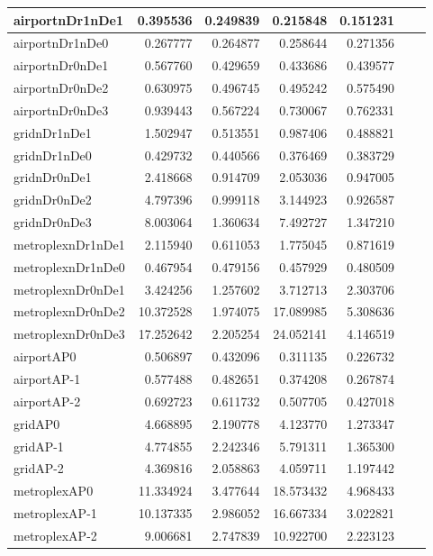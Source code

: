 \begin{longtable}{|l|r|r|r|r|r|r|}
\endlastfoot
airportnDr1nDe1 & 0.395536 & 0.249839 & 0.215848 & 0.151231 \\ \hline
airportnDr1nDe0 & 0.267777 & 0.264877 & 0.258644 & 0.271356 \\ \hline
airportnDr0nDe1 & 0.567760 & 0.429659 & 0.433686 & 0.439577 \\ \hline
airportnDr0nDe2 & 0.630975 & 0.496745 & 0.495242 & 0.575490 \\ \hline
airportnDr0nDe3 & 0.939443 & 0.567224 & 0.730067 & 0.762331 \\ \hline
gridnDr1nDe1 & 1.502947 & 0.513551 & 0.987406 & 0.488821 \\ \hline
gridnDr1nDe0 & 0.429732 & 0.440566 & 0.376469 & 0.383729 \\ \hline
gridnDr0nDe1 & 2.418668 & 0.914709 & 2.053036 & 0.947005 \\ \hline
gridnDr0nDe2 & 4.797396 & 0.999118 & 3.144923 & 0.926587 \\ \hline
gridnDr0nDe3 & 8.003064 & 1.360634 & 7.492727 & 1.347210 \\ \hline
metroplexnDr1nDe1 & 2.115940 & 0.611053 & 1.775045 & 0.871619 \\ \hline
metroplexnDr1nDe0 & 0.467954 & 0.479156 & 0.457929 & 0.480509 \\ \hline
metroplexnDr0nDe1 & 3.424256 & 1.257602 & 3.712713 & 2.303706 \\ \hline
metroplexnDr0nDe2 & 10.372528 & 1.974075 & 17.089985 & 5.308636 \\ \hline
metroplexnDr0nDe3 & 17.252642 & 2.205254 & 24.052141 & 4.146519 \\ \hline
airportAP0 & 0.506897 & 0.432096 & 0.311135 & 0.226732 \\ \hline
airportAP-1 & 0.577488 & 0.482651 & 0.374208 & 0.267874 \\ \hline
airportAP-2 & 0.692723 & 0.611732 & 0.507705 & 0.427018 \\ \hline
gridAP0 & 4.668895 & 2.190778 & 4.123770 & 1.273347 \\ \hline
gridAP-1 & 4.774855 & 2.242346 & 5.791311 & 1.365300 \\ \hline
gridAP-2 & 4.369816 & 2.058863 & 4.059711 & 1.197442 \\ \hline
metroplexAP0 & 11.334924 & 3.477644 & 18.573432 & 4.968433 \\ \hline
metroplexAP-1 & 10.137335 & 2.986052 & 16.667334 & 3.022821 \\ \hline
metroplexAP-2 & 9.006681 & 2.747839 & 10.922700 & 2.223123 \\ \hline

\end{longtable}
